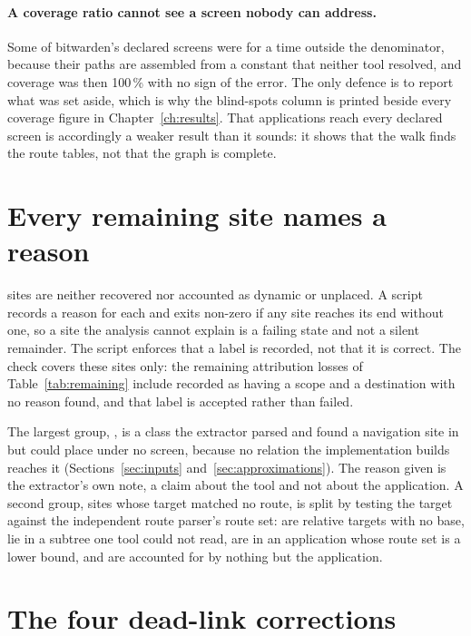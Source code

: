 \paragraph{A coverage ratio cannot see a screen nobody can address.} Some of bitwarden's declared screens were for a time outside the denominator, because their paths are assembled from a constant that neither tool resolved, and coverage was then 100\,\% with no sign of the error. The only defence is to report what was set aside, which is why the blind-spots column is printed beside every coverage figure in Chapter~\ref{ch:results}. That \RoundTwoFullNodes{} applications reach every declared screen is accordingly a weaker result than it sounds: it shows that the walk finds the route tables, not that the graph is complete.

\section{Every remaining site names a reason}
\label{app:reasons}

\RoundTwoUnexplained{} sites are neither recovered nor accounted as dynamic or unplaced. A script records a reason for each and exits non-zero if any site reaches its end without one, so a site the analysis cannot explain is a failing state and not a silent remainder. The script enforces that a label is recorded, not that it is correct. The check covers these sites only: the remaining attribution losses of Table~\ref{tab:remaining} include \AttrRemainingUnexplained{} recorded as having a scope and a destination with no reason found, and that label is accepted rather than failed.

The largest group, \RoundTwoUnplacedClass{}, is a class the extractor parsed and found a navigation site in but could place under no screen, because no relation the implementation builds reaches it (Sections~\ref{sec:inputs} and~\ref{sec:approximations}). The reason given is the extractor's own note, a claim about the tool and not about the application. A second group, \RoundTwoTargetNoRoute{} sites whose target matched no route, is split by testing the target against the independent route parser's route set: \RoundTwoRelativeUnresolved{} are relative targets with no base, \RoundTwoUnderUnreadable{} lie in a subtree one tool could not read, \RoundTwoNoRouteCaveated{} are in an application whose route set is a lower bound, and \RoundTwoDeadLinkUnanswered{} are accounted for by nothing but the application.

\section{The four dead-link corrections}
\label{app:deadlinkfixes}

